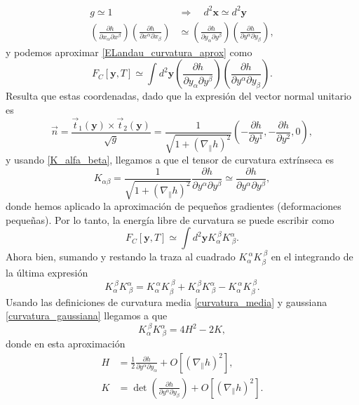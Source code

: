 \begin{align*}
g\simeq 1\quad&\Rightarrow\quad d^2\mathbf{x}\simeq d^2\mathbf{y}\\
\left(\frac{\partial h}{\partial x_{\alpha} \partial x^{\beta}}\right)
\left(\frac{\partial h}{\partial x^{\alpha} \partial x_{\beta}}\right)&\simeq \left(\frac{\partial h}{\partial y_{\alpha} \partial y^{\beta}}\right)
\left(\frac{\partial h}{\partial y^{\alpha} \partial y_{\beta}}\right) ,
\end{align*}
y podemos aproximar \eqref{ELandau_curvatura_aprox} como 
\begin{equation*}
F_C[\mathbf{y},T]\simeq\int d^2\mathbf{y} 
\left(\frac{\partial h}{\partial y_{\alpha} \partial y^{\beta}}\right)
\left(\frac{\partial h}{\partial y^{\alpha} \partial y_{\beta}}\right).
\end{equation*}
Resulta que estas coordenadas, dado que la expresión del vector normal
unitario es
\begin{equation*}
\vec{n}=\frac{\vec{t}_1(\mathbf{y})\times\vec{t}_2(\mathbf{y})}{\sqrt{g}}=\frac{1}{\sqrt{1+\left(\nabla_{\|} h\right)^2}} \left( -\frac{\partial h}{\partial y^1},-\frac{\partial h}{\partial y^2},0\right),
\end{equation*}
y usando \eqref{K_alfa_beta}, llegamos a que el tensor de curvatura extrínseca es
\begin{equation*}
K_{\alpha\beta}=\frac{1}{\sqrt{1+\left(\nabla_{\|} h\right)^2}}\frac{\partial h}{\partial
  y^{\alpha} \partial y^{\beta}}\simeq \frac{\partial h}{\partial
  y^{\alpha} \partial y^{\beta}},
\end{equation*}
donde hemos aplicado la aproximación de pequeños gradientes (deformaciones
pequeñas). Por lo tanto, la energía libre de curvatura \cite{Bowick:Membranes_review} se puede escribir como 
\begin{equation}\label{ELandau_curvatura1}
F_C[\mathbf{y},T]\simeq\int d^2\mathbf{y} K_{\alpha}^{\ \beta}K^{\alpha}_{\ \beta}.
\end{equation} 
Ahora bien, sumando y restando la traza al cuadrado $K_{\alpha}^{\
  \alpha}K_{\beta}^{\ \beta}$ en el integrando de la última expresión
\begin{equation*}
K_{\alpha}^{\ \beta}K^{\alpha}_{\ \beta}=K_{\alpha}^{\ \alpha}K_{\beta}^{\
  \beta}+K_{\alpha}^{\ \beta}K^{\alpha}_{\ \beta}-K_{\alpha}^{\ \alpha}K_{\beta}^{\ \beta}.
\end{equation*}
Usando las definiciones de curvatura media \eqref{curvatura_media} y
gaussiana \eqref{curvatura_gaussiana} llegamos a que
\begin{equation*}
K_{\alpha}^{\ \beta}K^{\alpha}_{\ \beta}=4H^2-2K,
\end{equation*} 
donde en esta aproximación
\begin{align*}
H&=\frac{1}{2}\frac{\partial h}{\partial y^{\alpha} \partial y_{\alpha}}+O\left[\left(\nabla_{\|} h\right)^2\right],\\
K&=\det \left(\frac{\partial h}{\partial y^{\alpha} \partial y_{\beta}}\right)+O\left[\left(\nabla_{\|} h\right)^2\right].
\end{align*}

